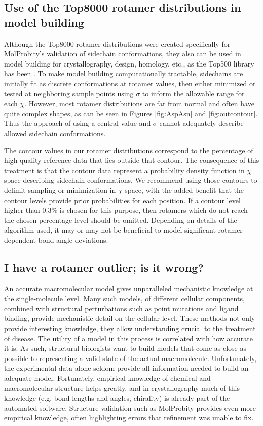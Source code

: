 \subsection{Use of the Top8000 rotamer distributions in model building}
Although the Top8000 rotamer distributions were created specifically for MolProbity's validation of sidechain conformations, they also can be used in model building for crystallography, design, homology, etc., as the Top500 library has been \cite{Langer2008, Emsley:ba5144, Headd2008, Terwilliger2008, Adams:2010fk, Gainza2013}. To make model building computationally tractable, sidechains are initially fit as discrete conformations at rotamer values, then either minimized or tested at neighboring sample points using $\sigma$ to inform the allowable range for each $\chi$. However, most rotamer distributions are far from normal and often have quite complex shapes, as can be seen in Figures \ref{fig:AspAsn} and \ref{fig:outcontour}. Thus the approach of using a central value and $\sigma$ cannot adequately describe allowed sidechain conformations. 

The contour values in our rotamer distributions correspond to the percentage of high-quality reference data that lies outside that contour. The consequence of this treatment is that the contour data represent a probability density function in $\chi$ space describing sidechain conformations. We recommend using those contours to delimit sampling or minimization in $\chi$ space, with the added benefit that the contour levels provide prior probabilities for each position. If a contour level higher than 0.3\% is chosen for this purpose, then rotamers which do not reach the chosen percentage level should be omitted. Depending on details of the algorithm used, it may or may not be beneficial to model significant rotamer-dependent bond-angle deviations.

\subsection{I have a rotamer outlier; is it wrong?}
An accurate macromolecular model gives unparalleled mechanistic knowledge at the single-molecule level. Many such models, of different cellular components, combined with structural perturbations such as point mutations and ligand binding, provide mechanistic detail on the cellular level. These methods not only provide interesting knowledge, they allow understanding crucial to the treatment of disease. The utility of a model in this process is correlated with how accurate it is. As such, structural biologists want to build models that come as close as possible to representing a valid state of the actual macromolecule. Unfortunately, the experimental data alone seldom provide all information needed to build an adequate model. Fortunately, empirical knowledge of chemical and macromolecular structure helps greatly, and in crystallography much of this knowledge (e.g. bond lengths and angles, chirality) is already part of the automated software. Structure validation such as MolProbity provides even more empirical knowledge, often highlighting errors that refinement was unable to fix.

